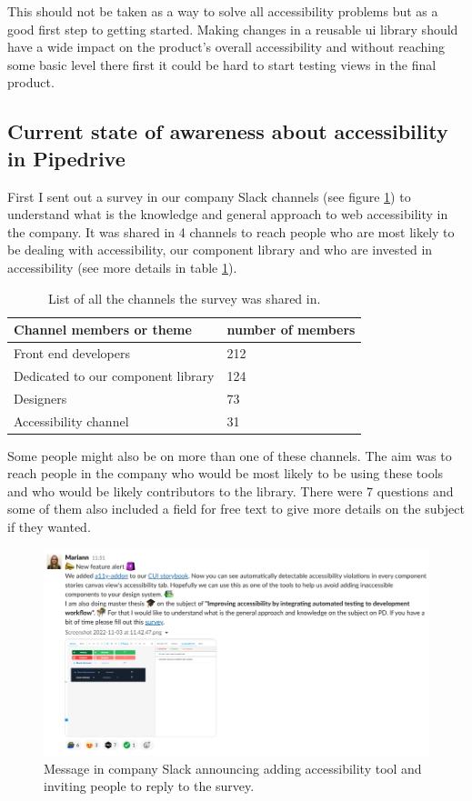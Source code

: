 \documentclass{master_thesis}
\begin{document}
This should not be taken as a way to solve all accessibility problems but as a good first step to getting started. Making changes in a reusable \ac{ui} library should have a wide impact on the product's overall accessibility and without reaching some basic level there first it could be hard to start testing views in the final product.

\subsection{Current state of awareness about accessibility in Pipedrive}

First I sent out a survey in our company Slack channels (see figure \ref{fig:slack-message}) to understand what is the knowledge and general approach to web accessibility in the company. It was shared in 4 channels to reach people who are most likely to be dealing with accessibility, our component library and who are invested in accessibility (see more details in table \ref{table:survey-shared}).

\begin{table}[H]
	\centering
	\begin{tabular}{|l|l|}
		\hline
		\textbf{Channel members or theme} & \textbf{number of members}  \\
		\hline
		Front end developers  & 212  \\
		\hline
		Dedicated to our component library  & 124  \\
		\hline
		Designers  & 73  \\
		\hline
		Accessibility channel  & 31  \\
		\hline
	\end{tabular}
	\caption{List of all the channels the survey was shared in.}
	\label{table:survey-shared}
\end{table}

Some people might also be on more than one of these channels. The aim was to reach people in the company who would be most likely to be using these tools and who would be likely contributors to the library. There were 7 questions and some of them also included a field for free text to give more details on the subject if they wanted.

\begin{figure}[H]
	\includegraphics[width=\textwidth]{img/survey.png}
	\caption{Message in company Slack announcing adding accessibility tool and inviting people to reply to the survey.}
	\label{fig:slack-message}
\end{figure}
\end{document}
